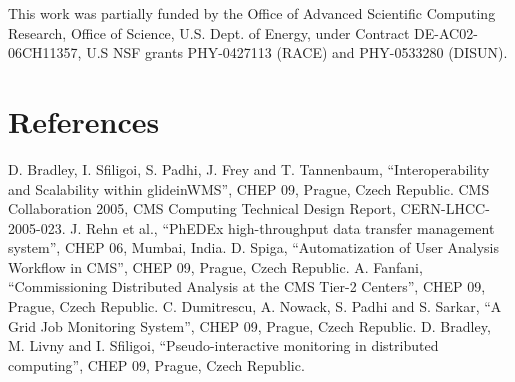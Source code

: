 \documentclass[a4paper]{jpconf}
\begin{document}
\ack
This work was partially funded by the Office of Advanced Scientific Computing
Research, Office of Science, U.S. Dept. of Energy, under Contract
DE-AC02-06CH11357, U.S NSF grants PHY-0427113 (RACE) and PHY-0533280 (DISUN).
\section*{References}
\begin{thebibliography}{15}

D. Bradley, I. Sfiligoi, S. Padhi, J. Frey and T. Tannenbaum, ``Interoperability and Scalability within glideinWMS'', CHEP 09, Prague, Czech Republic.
CMS Collaboration 2005, CMS Computing Technical Design Report, CERN-LHCC-2005-023.
J. Rehn et al., ``PhEDEx high-throughput data transfer management system'', CHEP 06, Mumbai, India.
D. Spiga, ``Automatization of User Analysis Workflow in CMS'', CHEP 09, Prague, Czech Republic.
A. Fanfani, ``Commissioning Distributed Analysis at the CMS Tier-2 Centers'', CHEP 09, Prague, Czech Republic.
C. Dumitrescu, A. Nowack, S. Padhi and S. Sarkar, ``A Grid Job Monitoring System'', CHEP 09, Prague, Czech Republic.
D. Bradley, M. Livny and I. Sfiligoi, ``Pseudo-interactive monitoring in distributed computing'', CHEP 09, Prague, Czech Republic.
\end{thebibliography}
\end{document}

